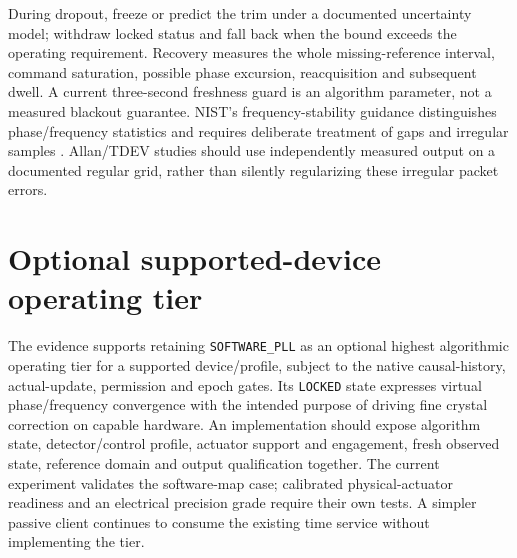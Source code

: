 \documentclass[11pt,letterpaper]{article}
\newcommand{\code}[1]{\texttt{\small #1}}
\begin{document}
During dropout, freeze or predict the trim under a documented uncertainty model; withdraw locked status and fall back when the bound exceeds the operating requirement. Recovery measures the whole missing-reference interval, command saturation, possible phase excursion, reacquisition and subsequent dwell. A current three-second freshness guard is an algorithm parameter, not a measured blackout guarantee. NIST's frequency-stability guidance distinguishes phase/frequency statistics and requires deliberate treatment of gaps and irregular samples \cite{nist}. Allan/TDEV studies should use independently measured output on a documented regular grid, rather than silently regularizing these irregular packet errors.

\section{Optional supported-device operating tier}
The evidence supports retaining \code{SOFTWARE\_PLL} as an optional highest algorithmic operating tier for a supported device/profile, subject to the native causal-history, actual-update, permission and epoch gates. Its \code{LOCKED} state expresses virtual phase/frequency convergence with the intended purpose of driving fine crystal correction on capable hardware. An implementation should expose algorithm state, detector/control profile, actuator support and engagement, fresh observed state, reference domain and output qualification together. The current experiment validates the software-map case; calibrated physical-actuator readiness and an electrical precision grade require their own tests. A simpler passive client continues to consume the existing time service without implementing the tier.
\end{document}
